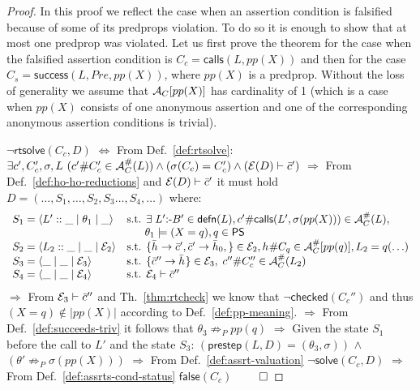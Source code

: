\documentclass{llncs}
\newcommand{\PS}{\textsf{PS}}
\newcommand{\AC}
  {\ensuremath{{\cal A}_{C}}}
\newcommand{\LabAClit}[1]
  {\ensuremath{\AC^{\#}(#1)}}
\newcommand{\ACpp}[1]
  {\ensuremath{\AC[#1]}}
\newcommand{\LabACpp}[1]
  {\ensuremath{\AC^{\#}[#1]}}
\newcommand{\gd}[0]{\mid}
\newcommand{\exstate}[3]
  {\ensuremath{\langle #1 \gd{} #2 \gd{} #3 \rangle}}
\newcommand{\ADeps}{\ensuremath{{\cal E}}}
\newcommand{\defn}[1]
  {\ensuremath{\textsf{defn}(#1)}}
\newcommand{\rtsolve}[2]
  {\textsf{rtsolve}(#1,#2)}
\newcommand{\clause}[2]
  {\ensuremath{#1 \textsf{:-} #2}}
\newcommand{\asrId}[1]{\ensuremath{c_{#1}}}
\newcommand{\negAsrId}[1]{\ensuremath{\bar{c}_{#1}}}
\newcommand{\hypId}[1]{\ensuremath{h_{#1}}}
\newcommand{\negHypId}[1]{\ensuremath{\bar{h}_{#1}}}
\newcommand{\checkedAsr}[1]{\ensuremath{\textsf{checked}(#1)}}
\newcommand{\falseAsr}[1]{\ensuremath{\textsf{false}(#1)}}
\newcommand{\callsAsr}[2]{\ensuremath{\textsf{calls}(#1, #2)}}
\newcommand{\successAsr}[3]{\ensuremath{\textsf{success}(#1, #2, #3)}}
\begin{document}
\begin{proof}
In this proof we reflect the case when an assertion condition is
  falsified because of some of its predprops violation.
To do so it is enough to show that at most one predprop was violated.  
Let us first prove the theorem for the case when the falsified
  assertion condition is $C_c = \callsAsr{L}{pp(X)}$ and then for the
  case $C_s = \successAsr{L}{Pre}{pp(X)}$, where $pp(X)$ is a predprop.
Without the loss of generality we assume that $\ACpp{pp(X)}$ has
  cardinality of 1 (which is a case when $pp(X)$ consists of one
  anonymous assertion and one of the corresponding anonymous assertion
  conditions is trivial).

\hfill\newline  
  $\neg\rtsolve{C_c}{D}$
\newline
  $\Leftrightarrow$ From Def.~\ref{def:rtsolve}: 
  $\exists \asrId{}', C_c', \sigma, L ~ (\asrId{}'\#C_c' \in \LabAClit{L})
    \wedge (\sigma(C_c) = C_c') \wedge (\ADeps(D) \vdash \negAsrId{}')$
\newline
  $\Rightarrow$ From Def.~\ref{def:ho-ho-reductions} and $\ADeps(D)
   \vdash \negAsrId{}'$ it must hold 
  $D = (\ldots,S_1,\ldots,S_2,S_3\ldots,S_4,\ldots)$ where:
  \[
  \begin{array}{ll}
    S_1 = \exstate{L'::\_}{\theta_1}{\_}
    & \text{s.t. } \exists\; \clause{L'}{B'} \in \defn{L}, 
      \asrId{}'\#\callsAsr{L'}{\sigma(pp(X))} \in \LabAClit{L},
    \\
    & ~~~~~\theta_1 \models (X = q), q \in \PS
    \\
    S_2 = \exstate{L_2::\_}{\_}{\ADeps_2}
    & \text{s.t. }
      \{\negHypId{}   \rightarrow \negAsrId{}',
        \negAsrId{}' \rightarrow \negHypId{0} ,\} \in \ADeps_2,
      \hypId{}\#C_q \in \LabACpp{pp(q)}, L_2 = q(\ldots)
    \\
    S_3 = \exstate{\_}{\_}{\ADeps_3}
    & \text{s.t. } 
      \{\negAsrId{}''  \rightarrow \negHypId{} \} \in \ADeps_3,\;
      \asrId{}''\#C_c'' \in \LabAClit{L_2}
    \\
    S_4 = \exstate{\_}{\_}{\ADeps_4}
    & \text{s.t. } \ADeps_4 \vdash \negAsrId{}''
  \end{array}
  \]
  $\Rightarrow$ From $\ADeps_3 \vdash \negAsrId{}''$ and
  Th.~\ref{thm:rtcheck} we know that $\neg\checkedAsr{C_c''}$
  and thus $(X = q) \not\in |pp(X)|$ according to
  Def.~\ref{def:pp-meaning}.
\newline
  $\Rightarrow$ From Def.~\ref{def:succeeds-triv}
  it follows that $\theta_3 \not\Rightarrow_P pp(q)$
\newline
  $\Rightarrow$
  Given the state $S_1$ before the call to $L'$ and the
  state $S_3$:
  $ ( \textsf{prestep}(L,D)=(\theta_3,\sigma) ) $
  $ \wedge $
  $ (\theta' \not\Rightarrow_P\sigma(pp(X))) $
\newline
  $\Rightarrow$ From Def.~\ref{def:assrt-valuation}
  $\neg\textsf{solve}(C_c,D)$
$\Rightarrow$ From Def.~\ref{def:assrts-cond-status} $\falseAsr{C_c}$
  \hfill $\qed$


\end{proof}
\end{document}
